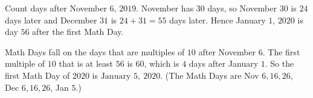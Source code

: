 Count days after November $6$, $2019$. November has $30$ days, so November $30$ is $24$ days later and December $31$ is $24+31=55$ days later. Hence January $1$, $2020$ is day $56$ after the first Math Day.

Math Days fall on the days that are multiples of $10$ after November $6$. The first multiple of $10$ that is at least $56$ is $60$, which is $4$ days after January $1$. So the first Math Day of $2020$ is $\boxed{\text{January }5,\ 2020}$. (The Math Days are Nov $6,16,26$, Dec $6,16,26$, Jan $5$.)
